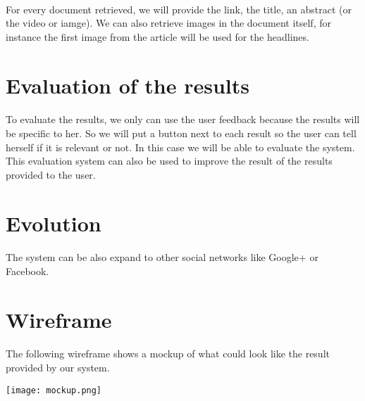 \documentclass[english,7pt]{article}
\begin{document}
\paragraph{}For every document retrieved, we will provide the link, the title, an abstract (or the video or iamge). We can also retrieve images in the document itself, for instance the first image from the article will be used for the headlines. 


\section{Evaluation of the results}

\paragraph{}To evaluate the results, we only can use the user feedback because the results will be specific to her. So we will put a button next to each result so the user can tell herself if it is relevant or not. In this case we will be able to evaluate the system. This evaluation system can also be used to improve the result of the results provided to the user. 


\section{Evolution}
\paragraph{}The system can be also expand to other social networks like Google+ or Facebook.

\section{Wireframe}
\paragraph{}The following wireframe shows a mockup of what could look like the result provided by our system.
 \begin{center}
   \texttt{[image: mockup.png]}
 \end{center}


 
\end{document}
